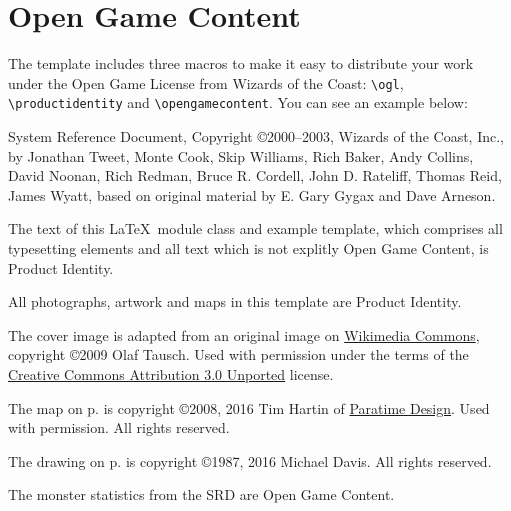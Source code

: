 \documentclass[a4paper,serif]{module}
\begin{document}
%
%

\section{Open Game Content}
\label{ogl}

The template includes three macros to make it easy to distribute your work under the Open Game License
from Wizards of the Coast: \verb|\ogl|, \verb|\productidentity| and \verb|\opengamecontent|. You can see
an example below:

\begin{ogl}
\item System Reference Document, Copyright \copyright 2000--2003, Wizards of the Coast, Inc., by Jonathan Tweet, Monte Cook,
Skip Williams, Rich Baker, Andy Collins, David Noonan, Rich Redman, Bruce R. Cordell, John D. Rateliff, Thomas Reid, James
Wyatt, based on original material by E. Gary Gygax and Dave Arneson.
\end{ogl}

\begin{productidentity}
\item The text of this \LaTeX~module class and example template, which comprises all typesetting elements and all text which
is not explitly Open Game Content, is Product Identity.
\modulecopyright

\item All photographs, artwork and maps in this template are Product Identity.

\item The cover image is adapted from an original image on
\href{https://commons.wikimedia.org/wiki/File:Karnak_Tempel_Vorhof_05.jpg}{Wikimedia Commons}, copyright \copyright 2009 Olaf
Tausch. Used with permission under the terms of the
\href{https://creativecommons.org/licenses/by/3.0/deed.en}{Creative Commons Attribution 3.0 Unported} license.

\item The map on p.\pageref{img:map} is copyright \copyright 2008, 2016 Tim Hartin of \href{http://paratime.ca}{Paratime Design}.
Used with permission. All rights reserved.

\item The drawing on p.\pageref{img:tomb} is copyright \copyright 1987, 2016 Michael Davis. All rights reserved.
\end{productidentity}

\begin{opengamecontent}
\item The monster statistics from the SRD are Open Game Content.
\end{opengamecontent}

\newpage

%
%

\tableofcontents

\end{document}
